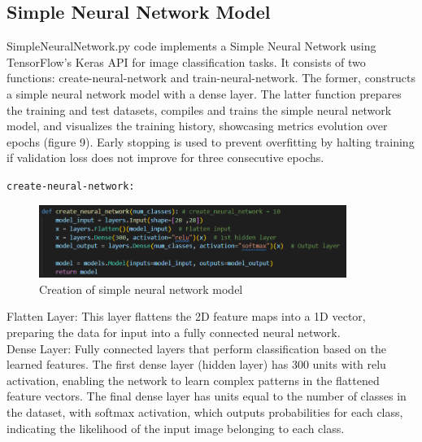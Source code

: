 \documentclass{article}
\newcommand{\code}[1]{\colorbox{light-gray}{\texttt{#1}}}
\begin{document}
\newpage
\subsection{Simple Neural Network Model}
SimpleNeuralNetwork.py code implements a Simple Neural Network using TensorFlow's Keras API for image classification tasks.
It consists of two functions: create-neural-network and train-neural-network.
The former, constructs a simple neural network model with a dense layer. The latter function prepares the training and test datasets, compiles and trains the simple neural network model, and visualizes the training history, showcasing metrics evolution over epochs (figure 9). Early stopping is used to prevent overfitting by halting training if validation loss does not improve for three consecutive epochs.\\\newline

\code{create-neural-network:}\\\newline
\begin{figure}[H]
    \caption{Creation of simple neural network model}
    \centering
    \includegraphics[width=10cm]{../imgFolder/create-neural-network-code.png}
\end{figure}

Flatten Layer: This layer flattens the 2D feature maps into a 1D vector,
preparing the data for input into a fully connected neural network.\\\newline
Dense Layer: Fully connected layers that perform classification based on the learned features.
The first dense layer (hidden layer) has 300 units with relu activation, enabling the network to learn complex
patterns in the flattened feature vectors.
The final dense layer has units equal to the number of classes
in the dataset, with softmax activation, which outputs probabilities for each class,
indicating the likelihood of the input image belonging to each class.\\\newline
\end{document}
